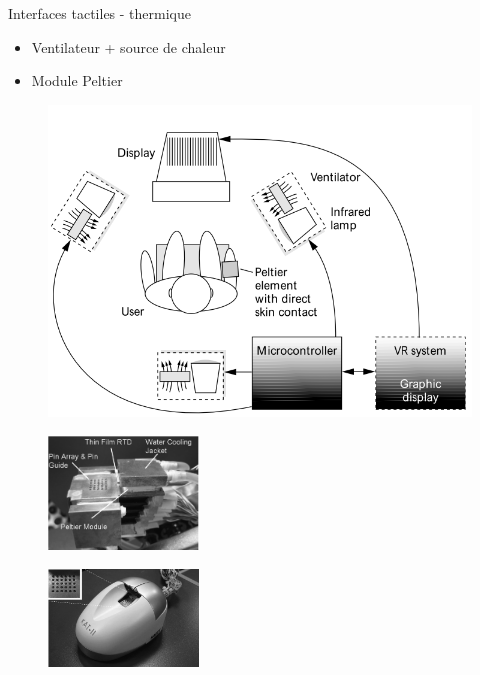 \begin{frame}{Interfaces tactiles - thermique}
\begin{multicols}{2}

\begin{itemize}
\item Ventilateur + source de chaleur
\item Module Peltier
\end{itemize}

\begin{figure}
\centering
\includegraphics[width=\linewidth]{images/thermalFeedback}\caption{\cite{Dionisio1997}}
\end{figure}

\begin{figure}
\centering
\includegraphics[width=4cm]{images/peltier}
\end{figure}

\begin{figure}
\centering
\includegraphics[width=4cm]{images/katII}
\caption{\cite{Yang2008}}
\end{figure}

\end{multicols}
\end{frame}

